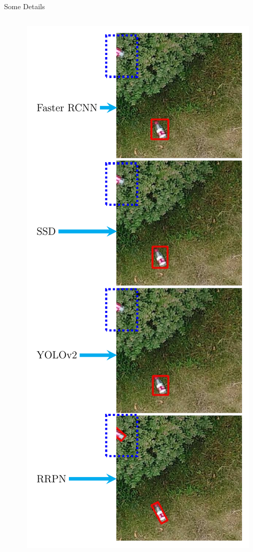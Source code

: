 \documentclass[newPxFont, fullfooter, sectionpages, progressbar]{beamer}
\begin{document}
\begin{frame}{Some Details}
\begin{columns}
\begin{column}{.48\linewidth}
		\end{column}

		\begin{column}{.48\linewidth}
			\includegraphics[height=1.0\textheight]{images/results_room2.pdf}
		\end{column}
	\end{columns}

\end{frame}
\end{document}
